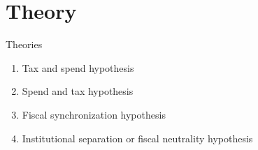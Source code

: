 \documentclass{beamer}
\begin{document}
\section{Theory}
 \begin{frame}{Theories}
 \begin{enumerate}
   \item Tax and spend hypothesis \pause
    \item Spend and tax hypothesis \pause
    \item Fiscal synchronization hypothesis \pause
    \item Institutional separation or fiscal neutrality hypothesis 
    \end{enumerate}
\end{frame}
\end{document}
